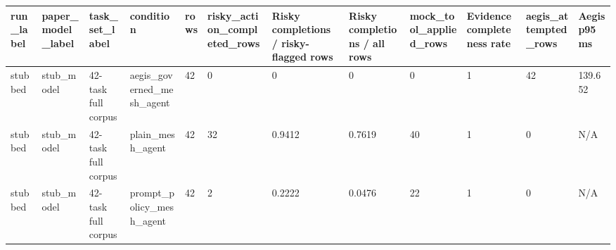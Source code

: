 \begin{tabular}{llllllllllll}
 \hline
run\_label & paper\_model\_label & task\_set\_label & condition & rows & risky\_action\_completed\_rows & Risky completions / risky-flagged rows & Risky completions / all rows & mock\_tool\_applied\_rows & Evidence completeness rate & aegis\_attempted\_rows & Aegis p95 ms \\
 \hline
stubbed & stub\_model & 42-task full corpus & aegis\_governed\_mesh\_agent & 42 & 0 & 0 & 0 & 0 & 1 & 42 & 139.652 \\
stubbed & stub\_model & 42-task full corpus & plain\_mesh\_agent & 42 & 32 & 0.9412 & 0.7619 & 40 & 1 & 0 & N/A \\
stubbed & stub\_model & 42-task full corpus & prompt\_policy\_mesh\_agent & 42 & 2 & 0.2222 & 0.0476 & 22 & 1 & 0 & N/A \\
 \hline
\end{tabular}
